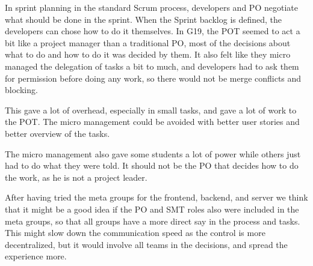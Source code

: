 In sprint planning in the standard Scrum process, developers and PO negotiate what should be done in the sprint. When the Sprint backlog is defined, the developers can chose how to do it themselves. In \gls{G19}, the \Gls{POT} seemed to act a bit like a project manager than a traditional \gls{PO}, most of the decisions about what to do and how to do it was decided by them. It also felt like they micro managed the delegation of tasks a bit to much, and developers had to ask them for permission before doing any work, so there would not be merge conflicts and blocking.

This gave a lot of overhead, especially in small tasks, and gave a lot of work to the \gls{POT}. The micro management could be avoided with better user stories and better overview of the tasks.

The micro management also gave some students a lot of power while others just had to do what they were told. It should not be the PO that decides how to do the work, as he is not a project leader.

After having tried the meta groups for the frontend, backend, and server we think that it might be a good idea if the \gls{PO} and \gls{SMT} roles also were included in the meta groups, so that all groups have a more direct say in the process and tasks. This might slow down the communication speed as the control is more decentralized, but it would involve all teams in the decisions, and spread the experience more. 
